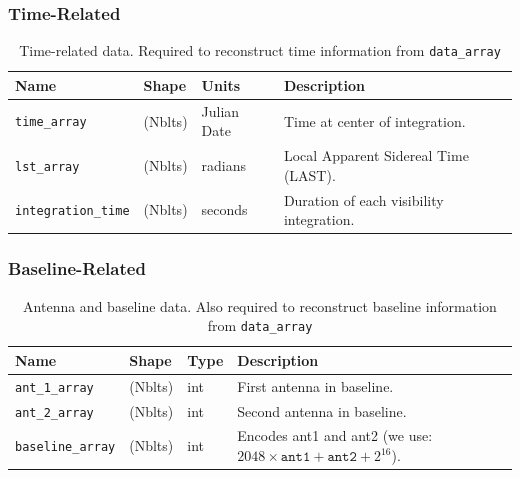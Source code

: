 
\subsubsection{Time-Related}
\begin{table}[H]
\centering
\begin{tabular}{|l|l|l|l|}
\hline
\textbf{Name} & \textbf{Shape} & \textbf{Units} & \textbf{Description} \\
\hline
\texttt{time\_array} & (Nblts) & Julian Date & Time at center of integration. \\
\hline
\texttt{lst\_array} & (Nblts) & radians & Local Apparent Sidereal Time (LAST). \\
\hline
\texttt{integration\_time} & (Nblts) & seconds & Duration of each visibility integration. \\
\hline
\end{tabular}
\caption{Time-related data. Required to reconstruct time information from \texttt{data\_array}}
\end{table}

\subsubsection{Baseline-Related}
\begin{table}[H]
\centering
\begin{tabular}{|l|l|l|l|}
\hline
\textbf{Name} & \textbf{Shape} & \textbf{Type} & \textbf{Description} \\
\hline
\texttt{ant\_1\_array} & (Nblts) & int & First antenna in baseline. \\
\hline
\texttt{ant\_2\_array} & (Nblts) & int & Second antenna in baseline. \\
\hline
\texttt{baseline\_array} & (Nblts) & int & Encodes ant1 and ant2 (we use: $2048 \times \texttt{ant1} + \texttt{ant2} + 2^{16}$)\footnotemark[2]. \\
\hline
\end{tabular}
\caption{Antenna and baseline data. Also required to reconstruct baseline information from \texttt{data\_array}}
\end{table}


